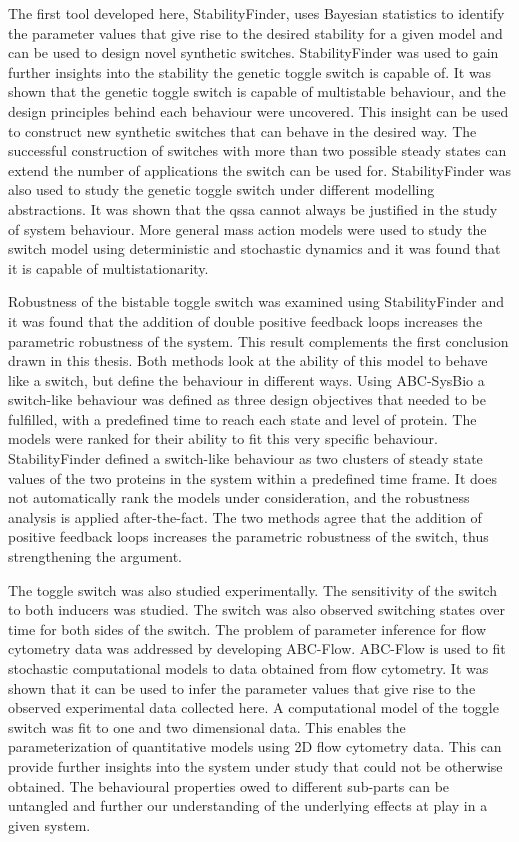 The first tool developed here, StabilityFinder, uses Bayesian statistics to identify the parameter values that give rise to the desired stability for a given model and can be used to design novel synthetic switches. StabilityFinder was used to gain further insights into the stability the genetic toggle switch is capable of. It was shown that the genetic toggle switch is capable of multistable behaviour, and the design principles behind each behaviour were uncovered. This insight can be used to construct new synthetic switches that can behave in the desired way. The successful construction of switches with more than two possible steady states can extend the number of applications the switch can be used for. StabilityFinder was also used to study the genetic toggle switch under different modelling abstractions. It was shown that the \acrshort{qssa} cannot always be justified in the study of system behaviour. More general mass action models were used to study the switch model using deterministic and stochastic dynamics and it was found that it is capable of multistationarity. 

Robustness of the bistable toggle switch was examined using StabilityFinder and it was found that the addition of double positive feedback loops  increases the parametric robustness of the system. This result complements the first conclusion drawn in this thesis. Both methods look at the ability of this model to behave like a switch, but define the behaviour in different ways. Using ABC-SysBio a switch-like behaviour was defined as three design objectives that needed to be fulfilled, with a predefined time to reach each state and level of protein. The models were ranked for their ability to fit this very specific behaviour. StabilityFinder defined a switch-like behaviour as two clusters of steady state values of the two proteins in the system within a predefined time frame. It does not automatically rank the models under consideration, and the robustness analysis is applied after-the-fact. The two methods agree that the addition of positive feedback loops increases the parametric robustness of the switch, thus strengthening the argument.  

The toggle switch was also studied experimentally. The sensitivity of the switch to both inducers was studied. The switch was also observed switching states over time for both sides of the switch. The problem of parameter inference for flow cytometry data was addressed by developing ABC-Flow.  ABC-Flow is used to fit stochastic computational models to data obtained from flow cytometry. It was shown that it can be used to infer the parameter values that give rise to the observed experimental data collected here. A computational model of the toggle switch was fit to one and two dimensional data. This enables the parameterization of quantitative models using 2D flow cytometry data. This can provide further insights into the system under study that could not be otherwise obtained. The behavioural properties owed to different sub-parts can be untangled and further our understanding of the underlying effects at play in a given system.

